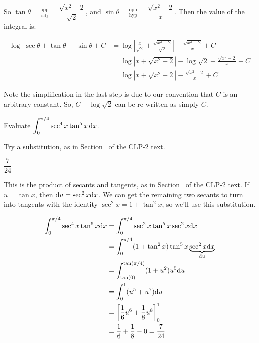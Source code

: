 \begin{solution}
\begin{center}
\end{center}

So $\tan \theta = \frac{\mbox{opp}}{\mbox{adj}}=\dfrac{\sqrt{x^2-2}}{\sqrt{2}}$, and $\sin\theta = \frac{\mbox{opp}}{\mbox{hyp}}=\dfrac{\sqrt{x^2-2}}{x}$. Then the value of the integral is:

\begin{align*}
\log|\sec\theta + \tan\theta|-\sin\theta +C
&={ \log \left|
\frac{x}{\sqrt{2}}+\frac{\sqrt{x^2-2}}{\sqrt{2}}
\right|-\frac{\sqrt{x^2-2}}{x}+C}\\
&={ \log \left| x+{\sqrt{x^2-2}}
\right|-\log\sqrt{2}-\frac{\sqrt{x^2-2}}{x}+C}\\
&= \log \left| x+{\sqrt{x^2-2}}
\right|-\frac{\sqrt{x^2-2}}{x}+C
\end{align*}

Note the simplification in the last step is due to our convention that $C$ is an arbitrary constant. So, $C-\log\sqrt{2}$ can be re-written as simply $C$.
\end{solution}




\begin{question} Evaluate
$\displaystyle\int_0^{\pi/4} \sec^4x\tan^5x\,\mathrm{d}x$.
\end{question}

\begin{hint}
Try a substitution, as in Section~ of the CLP-2 text.%
\end{hint}

\begin{answer}
$\dfrac{7}{24}$
\end{answer}

\begin{solution}

This is the product of secants and tangents, as in Section~
of the CLP-2 text. %
 If $u=\tan x$, then $\mathrm{d}u=\sec^2x\mathrm{d}x$. We can get the remaining two secants to turn into tangents with the identity $\sec^2x=1+\tan^2x$, so we'll use this substitution.

\begin{align*}
\int_{0}^{\pi/4} \sec^4x\tan^5x\mathrm{d}x&=
\int_{0}^{\pi/4} \sec^2x\tan^5x\sec^2x\mathrm{d}x\\
&=
\int_{0}^{\pi/4} (1+\tan^2x)\tan^5x\underbrace{\sec^2x\mathrm{d}x}_{\mathrm{d}u}
\\
&=
\int_{\tan(0)}^{\tan(\pi/4)} (1+u^2)u^5\mathrm{d}u
\\
&=
\int_{0}^{1} (u^5+u^7)\mathrm{d}u
\\
&=
\left[\frac{1}{6}u^6+\frac{1}{8}u^8\right]_{0}^{1}
\\
&=\frac{1}{6}+\frac{1}{8}-0=\frac{7}{24}
\end{align*}
\end{solution}







